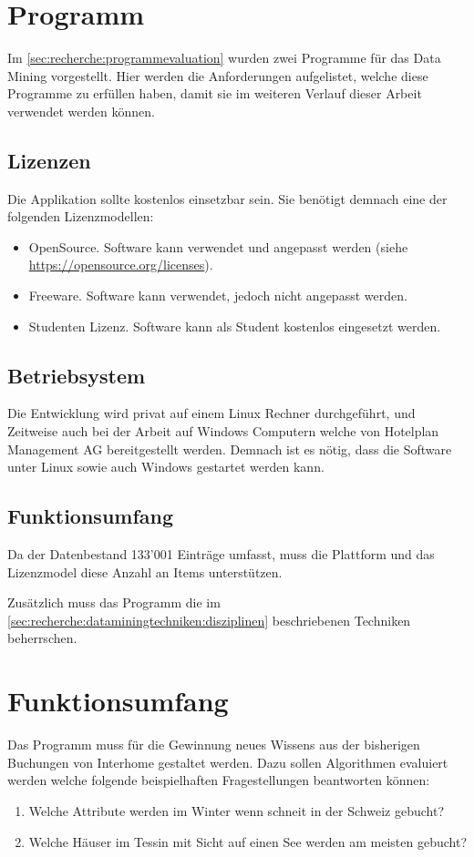 \section{Programm}
\label{sec:anforderungsanalyse:programm}
Im \cref{sec:recherche:programmevaluation} wurden zwei Programme für das Data Mining vorgestellt. Hier werden die Anforderungen aufgelistet, welche diese Programme zu erfüllen haben, damit sie im weiteren Verlauf dieser Arbeit verwendet werden können.

\subsection{Lizenzen}
\label{sec:anforderungsanalyse:programm:lizenzen}
Die Applikation sollte kostenlos einsetzbar sein. Sie benötigt demnach eine der folgenden Lizenzmodellen:
\begin{itemize}
\item OpenSource. Software kann verwendet und angepasst werden (siehe \url{https://opensource.org/licenses}).
\item Freeware. Software kann verwendet, jedoch nicht angepasst werden.
\item Studenten Lizenz. Software kann als Student kostenlos eingesetzt werden.
\end{itemize}

\subsection{Betriebsystem}
\label{sec:anforderungsanalyse:programm:betriebsystem}
Die Entwicklung wird privat auf einem Linux Rechner durchgeführt, und Zeitweise auch bei der Arbeit auf Windows Computern welche von Hotelplan Management AG bereitgestellt werden.
Demnach ist es nötig, dass die Software unter Linux sowie auch Windows gestartet werden kann.

\subsection{Funktionsumfang}
\label{sec:anforderungsanalyse:programm:funktionsumfang}
Da der Datenbestand 133'001 Einträge umfasst, muss die Plattform und das Lizenzmodel diese Anzahl an Items unterstützen.

Zusätzlich muss das Programm die im \cref{sec:recherche:dataminingtechniken:disziplinen} beschriebenen Techniken beherrschen.

\section{Funktionsumfang}
Das Programm muss für die Gewinnung neues Wissens aus der bisherigen Buchungen von Interhome gestaltet werden. Dazu sollen Algorithmen evaluiert werden welche folgende beispielhaften Fragestellungen beantworten können:
\begin{enumerate}
\item Welche Attribute werden im Winter wenn schneit in der Schweiz gebucht?
\item Welche Häuser im Tessin mit Sicht auf einen See werden am meisten gebucht?
\end{enumerate}

